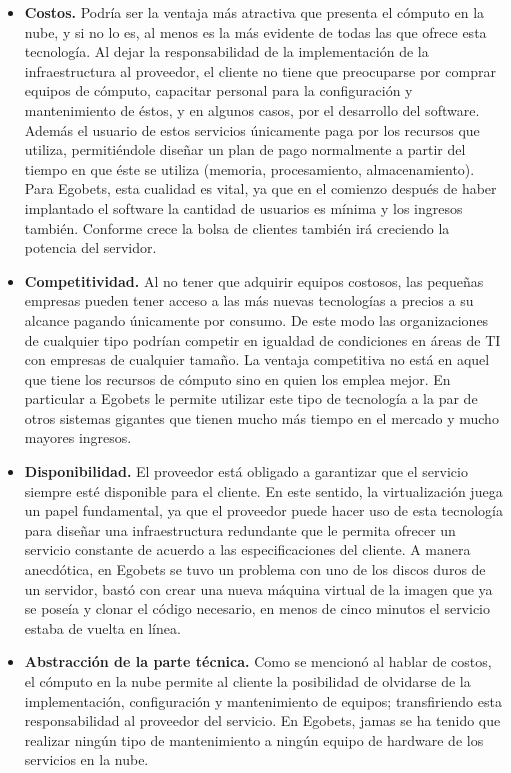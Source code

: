 \begin{itemize}
	\item \textbf{Costos.} Podría ser la ventaja más atractiva que presenta el cómputo en la nube, y si no lo es, al menos es la más evidente de todas las que ofrece esta tecnología. Al dejar la responsabilidad de la implementación de la infraestructura al proveedor, el cliente no tiene que preocuparse por comprar equipos de cómputo, capacitar personal para la configuración y mantenimiento de éstos, y en algunos casos, por el desarrollo del software. Además el usuario de estos servicios únicamente paga por los recursos que utiliza, permitiéndole diseñar un plan de pago normalmente a partir del tiempo en que éste se utiliza (memoria, procesamiento, almacenamiento). Para Egobets, esta cualidad es vital, ya que en el comienzo después de haber implantado el software la cantidad de usuarios es mínima y los ingresos también. Conforme crece la bolsa de clientes también irá creciendo la potencia del servidor.

	\item \textbf{Competitividad.} Al no tener que adquirir equipos costosos, las pequeñas empresas pueden tener acceso a las más nuevas tecnologías a precios a su alcance pagando únicamente por consumo. De este modo las organizaciones de cualquier tipo podrían competir en igualdad de condiciones en áreas de TI con empresas de cualquier tamaño. La ventaja competitiva no está en aquel que tiene los recursos de cómputo sino en quien los emplea mejor. En particular a Egobets le permite utilizar este tipo de tecnología a la par de otros sistemas gigantes que tienen mucho más tiempo en el mercado y mucho mayores ingresos.

	\item \textbf{Disponibilidad.} El proveedor está obligado a garantizar que el servicio siempre esté disponible para el cliente. En este sentido, la virtualización juega un papel fundamental, ya que el proveedor puede hacer uso de esta tecnología para diseñar una infraestructura redundante que le permita ofrecer un servicio constante de acuerdo a las especificaciones del cliente. A manera anecdótica, en Egobets se tuvo un problema con uno de los discos duros de un servidor, bastó con crear una nueva máquina virtual de la imagen que ya se poseía y clonar el código necesario, en menos de cinco minutos el servicio estaba de vuelta en línea.


	\item \textbf{Abstracción de la parte técnica.} Como se mencionó al hablar de costos, el cómputo en la nube permite al cliente la posibilidad de olvidarse de la implementación, configuración y mantenimiento de equipos; transfiriendo esta responsabilidad al proveedor del servicio. En Egobets, jamas se ha tenido que realizar ningún tipo de mantenimiento a ningún equipo de hardware de los servicios en la nube.


\end{itemize}
